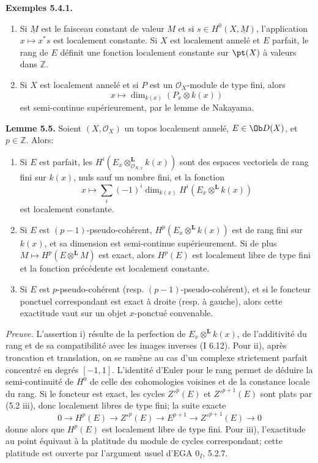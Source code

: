 \documentclass[11pt]{article}
\begin{document}
\textbf{Exemples 5.4.1.}
\begin{enumerate}[label=\alph*)]
\item Si \(\underline M\) est le faisceau constant de valeur \(M\) et si \(s\in H^0(X,\underline M)\), l'application \(x\mapsto x^*s\) est localement constante. Si \(X\) est localement annelé et \(E\) parfait, le rang de \(E\) définit une fonction localement constante sur \(\pt(X)\) à valeurs dans \(\mathbb Z\).
\item Si \(X\) est localement annelé et si \(P\) est un \(\mathcal O_X\)-module de type fini, alors
\[
 x\longmapsto \dim_{k(x)}(P_x\otimes k(x))
\]
est semi-continue supérieurement, par le lemme de Nakayama.
\end{enumerate}

\textbf{Lemme 5.5.} Soient \((X,\mathcal O_X)\) un topos localement annelé, \(E\in\Ob D(X)\), et \(p\in\mathbb Z\). Alors:
\begin{enumerate}[label=\roman*)]
\item Si \(E\) est parfait, les \(H^i(E_x\otimes_{\mathcal O_{X,x}}^{\mathbf L}k(x))\) sont des espaces vectoriels de rang fini sur \(k(x)\), nuls sauf un nombre fini, et la fonction
\[
 x\longmapsto\sum_i(-1)^i\dim_{k(x)}H^i(E_x\otimes^{\mathbf L}k(x))
\]
est localement constante.
\item Si \(E\) est \((p-1)\)-pseudo-cohérent, \(H^p(E_x\otimes^{\mathbf L}k(x))\) est de rang fini sur \(k(x)\), et sa dimension est semi-continue supérieurement. Si de plus \(M\mapsto H^p(E\otimes^{\mathbf L}M)\) est exact, alors \(H^p(E)\) est localement libre de type fini et la fonction précédente est localement constante.
\item Si \(E\) est \(p\)-pseudo-cohérent (resp. \((p-1)\)-pseudo-cohérent), et si le foncteur ponctuel correspondant est exact à droite (resp. à gauche), alors cette exactitude vaut sur un objet \(x\)-ponctué convenable.
\end{enumerate}

\emph{Preuve.} L'assertion i) résulte de la perfection de \(E_x\otimes^{\mathbf L}k(x)\), de l'additivité du rang et de sa compatibilité avec les images inverses (I 6.12). Pour ii), après troncation et translation, on se ramène au cas d'un complexe strictement parfait concentré en degrés \([-1,1]\). L'identité d'Euler pour le rang permet de déduire la semi-continuité de \(H^0\) de celle des cohomologies voisines et de la constance locale du rang. Si le foncteur est exact, les cycles \(Z'^p(E)\) et \(Z'^{p+1}(E)\) sont plats par (5.2 iii), donc localement libres de type fini; la suite exacte
\[
0\to H^p(E)\to Z'^p(E)\to E^{p+1}\to Z'^{p+1}(E)\to0
\]
donne alors que \(H^p(E)\) est localement libre de type fini. Pour iii), l'exactitude au point équivaut à la platitude du module de cycles correspondant; cette platitude est ouverte par l'argument usuel d'EGA \(0_I\), 5.2.7.
\end{document}
